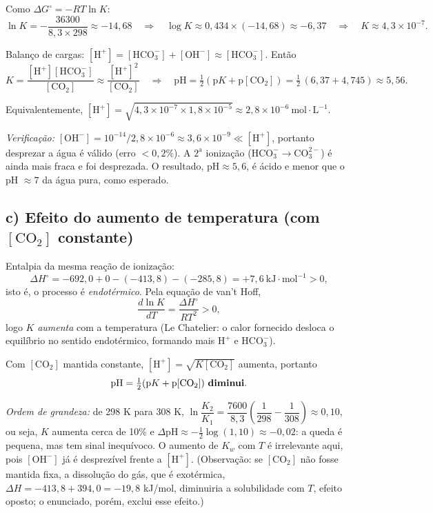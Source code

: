 \documentclass{article}%
\begin{document}
Como $\Delta G^\circ=-RT\ln K$:
\[
\ln K=-\frac{36300}{8{,}3\times 298}\approx -14{,}68
\quad\Rightarrow\quad
\log K\approx 0{,}434\times(-14{,}68)\approx -6{,}37
\quad\Rightarrow\quad K\approx 4{,}3\times10^{-7}.
\]

Balanço de cargas: $[\mathrm{H^+}]=[\mathrm{HCO_3^-}]+[\mathrm{OH^-}]\approx[\mathrm{HCO_3^-}]$. Então
\[
K=\frac{[\mathrm{H^+}][\mathrm{HCO_3^-}]}{[\mathrm{CO_2}]}\approx\frac{[\mathrm{H^+}]^2}{[\mathrm{CO_2}]}
\quad\Rightarrow\quad
\mathrm{pH}=\tfrac12\left(\mathrm{p}K+\mathrm{p}[\mathrm{CO_2}]\right)=\tfrac12\,(6{,}37+4{,}745)\approx 5{,}56 .
\]

Equivalentemente, $[\mathrm{H^+}]=\sqrt{4{,}3\times10^{-7}\times1{,}8\times10^{-5}}\approx 2{,}8\times10^{-6}\ \text{mol}\cdot\text{L}^{-1}$.

\emph{Verificação:} $[\mathrm{OH^-}]=10^{-14}/2{,}8\times10^{-6}\approx 3{,}6\times10^{-9}\ll[\mathrm{H^+}]$, portanto desprezar a água é válido (erro $<0{,}2\%$). A $2^{\mathrm a}$ ionização ($\mathrm{HCO_3^-\rightarrow CO_3^{2-}}$) é ainda mais fraca e foi desprezada. O resultado, $\mathrm{pH}\approx5{,}6$, é ácido e menor que o pH $\approx 7$ da água pura, como esperado.

\subsection*{c) Efeito do aumento de temperatura (com $[\mathrm{CO_2}]$ constante)}

Entalpia da mesma reação de ionização:
\[
\Delta H^\circ = -692{,}0+0-(-413{,}8)-(-285{,}8)=+7{,}6\ \text{kJ}\cdot\text{mol}^{-1}>0 ,
\]
isto é, o processo é \emph{endotérmico}. Pela equação de van't Hoff,
\[
\frac{d\ln K}{dT}=\frac{\Delta H^\circ}{RT^2}>0 ,
\]
logo $K$ \emph{aumenta} com a temperatura (Le Chatelier: o calor fornecido desloca o equilíbrio no sentido endotérmico, formando mais $\mathrm{H^+}$ e $\mathrm{HCO_3^-}$).

Com $[\mathrm{CO_2}]$ mantida constante, $[\mathrm{H^+}]=\sqrt{K[\mathrm{CO_2}]}$ aumenta, portanto
\[
\mathrm{pH}=\tfrac12(\mathrm{p}K+\mathrm{p}[\mathrm{CO_2}])\ \text{\textbf{diminui}}.
\]

\emph{Ordem de grandeza:} de 298 K para 308 K, $\ln\dfrac{K_2}{K_1}=\dfrac{7600}{8{,}3}\left(\dfrac1{298}-\dfrac1{308}\right)\approx0{,}10$, ou seja, $K$ aumenta cerca de 10\% e $\Delta\mathrm{pH}\approx-\tfrac12\log(1{,}10)\approx-0{,}02$: a queda é pequena, mas tem sinal inequívoco. O aumento de $K_w$ com $T$ é irrelevante aqui, pois $[\mathrm{OH^-}]$ já é desprezível frente a $[\mathrm{H^+}]$. (Observação: se $[\mathrm{CO_2}]$ não fosse mantida fixa, a dissolução do gás, que é exotérmica, $\Delta H=-413{,}8+394{,}0=-19{,}8$ kJ/mol, diminuiria a solubilidade com $T$, efeito oposto; o enunciado, porém, exclui esse efeito.)
\end{document}
